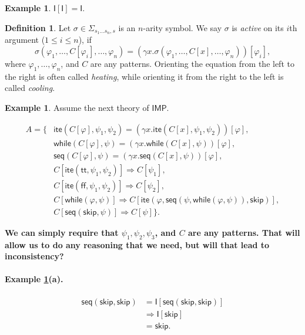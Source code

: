 \documentclass{article}
\newcommand{\comment}[1]
    {\par {\bfseries \color{blue} #1 \par}} %
\newcounter{thmcounter}
\theoremstyle{plain}
\theoremstyle{definition}
\newtheorem{definition}[thmcounter]{Definition}
\newtheorem{example}[thmcounter]{Example}
\theoremstyle{remark}
\newcommand{\IMP}{\mathsf{IMP}}
\newcommand{\impite}{\mathsf{ite}}
\newcommand{\impwhile}{\mathsf{while}}
\newcommand{\imptt}{\mathsf{tt}}
\newcommand{\impff}{\mathsf{ff}}
\newcommand{\impskip}{\mathsf{skip}}
\newcommand{\impseq}{\mathsf{seq}}
\newcommand{\I}{\mathsf{I}}
\begin{document}
\begin{example}
	$\I[\I] = \I$.
\end{example}

\begin{definition}
	Let $\sigma \in \Sigma_{s_1\dots s_n, s}$ is an $n$-arity symbol. We say $\sigma$ is \emph{active} on its $i$th argument ($1 \le i \le n$), if
	$$\sigma(\varphi_1,\dots, C[\varphi_i], \dots, \varphi_n)
	= (\gamma x . \sigma(\varphi_1,\dots,C[x], \dots, \varphi_n))[\varphi_i],$$
	where $\varphi_1,\dots,\varphi_n$, and $C$ are any patterns. Orienting the equation from the left to the right is often called \emph{heating}, while orienting it from the right to the left is called \emph{cooling}.
\end{definition}

\begin{example} Assume the next theory of $\IMP$.
\label{example:IMP}

\begin{align*}
  A = \{&\impite(C[\varphi], \psi_1, \psi_2) = (\gamma x . \impite(C[x], \psi_1, \psi_2))[\varphi], \\
        &\impwhile(C[\varphi], \psi) = (\gamma x . \impwhile(C[x], \psi))[\varphi], \\
        &\impseq(C[\varphi], \psi) = (\gamma x . \impseq(C[x], \psi))[\varphi], \\
        &C[\impite(\imptt, \psi_1, \psi_2)] \Rightarrow C[\psi_1], \\
        &C[\impite(\impff, \psi_1, \psi_2)] \Rightarrow C[\psi_2], \\
        &C[\impwhile(\varphi, \psi)] \Rightarrow C[\impite(\varphi, \impseq(\psi, \impwhile(\varphi, \psi)), \impskip)], \\
        &C[\impseq(\impskip,\psi)] \Rightarrow C[\psi] \}.
\end{align*}

\comment{We can simply require that $\psi_1, \psi_2, \psi_3$, and $C$ are any patterns. That will allow us to do any reasoning that we need, but will that lead to inconsistency?}

\paragraph{Example \ref{example:IMP}(a).} 
	\begin{align*}
	\impseq(\impskip,\impskip)
	&= \mathsf{I}[\impseq(\impskip,\impskip)] \\
	&\Rightarrow \mathsf{I}[\impskip] \\
	&= \impskip.
	\end{align*}
	

\end{example}
\end{document}
